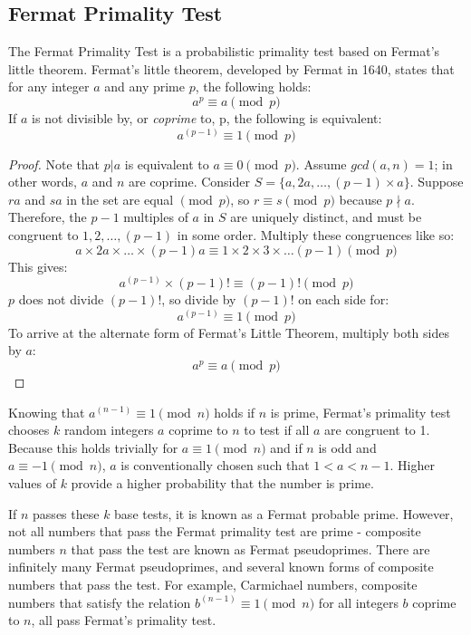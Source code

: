 \documentclass{article}
\begin{document}
\subsection{Fermat Primality Test}
The Fermat Primality Test is a probabilistic primality test based on Fermat's little theorem.
Fermat's little theorem, developed by Fermat in 1640, states that for any integer $a$ and any prime $p$, the following holds:
\[
    a^p \equiv a \pmod{p} 
\]
If $a$ is not divisible by, or \emph{coprime} to, p, the following is equivalent:
\[
    a^{(p - 1)} \equiv 1 \pmod{p} 
\]

\begin{proof}
Note that $p \vert a$ is equivalent to $a \equiv 0 \pmod{p}$.
Assume $gcd(a, n) = 1$; in other words, $a$ and $n$ are coprime.
Consider $S = \{a, 2a, \ldots{}, (p - 1) \times a\}$.
Suppose $ra$ and $sa$ in the set are equal $\pmod{p}$, so $r \equiv s \pmod{p}$ because $p \nmid a$.
Therefore, the $p - 1$ multiples of $a$ in $S$ are uniquely distinct, and must be congruent to ${1, 2, \ldots{}, (p - 1)}$ in some order.
Multiply these congruences like so:
    \[a \times 2a \times \ldots{} \times (p - 1)a \equiv 1 \times 2 \times 3 \times \ldots{} (p - 1) \pmod{p}\]
This gives:
    \[a^{(p - 1)} \times (p - 1)! \equiv (p - 1)! \pmod{p}\]
$p$ does not divide $(p - 1)!$, so divide by $(p - 1)!$ on each side for:
    \[a^{(p - 1)} \equiv 1 \pmod{p}\]
To arrive at the alternate form of Fermat's Little Theorem, multiply both sides by $a$:
    \[a^p \equiv a \pmod{p}\]
\end{proof}

Knowing that $a^{(n - 1)} \equiv 1 \pmod{n}$ holds if $n$ is prime, Fermat's primality test chooses $k$ random integers $a$ coprime to $n$ to test if all $a$ are congruent to 1. Because this holds trivially for $a \equiv 1 \pmod{n}$ and if $n$ is odd and $a \equiv -1 \pmod{n}$, $a$ is conventionally chosen such that $1 < a < n - 1$. Higher values of $k$ provide a higher probability that the number is prime.

If $n$ passes these $k$ base tests, it is known as a Fermat probable prime. However, not all numbers that pass the Fermat primality test are prime - composite numbers $n$ that pass the test are known as Fermat pseudoprimes. There are infinitely many Fermat pseudoprimes, and several known forms of composite numbers that pass the test. For example, Carmichael numbers, composite numbers that satisfy the relation $b^{(n-1)} \equiv 1 \pmod{n}$ for all integers $b$ coprime to $n$, all pass Fermat's primality test.
\end{document}
